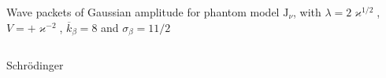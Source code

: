 \documentclass[9pt]{beamer}
\begin{document}
\begin{frame}%
{Wave packets of Gaussian amplitude for phantom model}%
{$\mathrm{J}_{\nu}$, with $\lambda = 2\varkappa^{1/2}$,
$V = +\varkappa^{-2}$, $\overline{k}_\beta = 8$ and $\sigma_\beta = 11/2$}
\begin{columns}
\begin{column}{.49\textwidth}
\begin{block}{Schrödinger}

\end{block}
\end{column}
\end{columns}
\end{frame}
\end{document}
